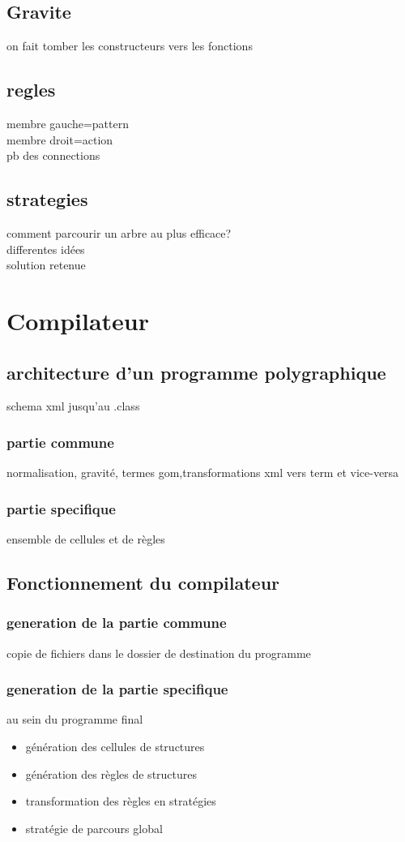 \documentclass[a4paper,11pt,titlepage]{article}
\begin{document}
{\subsection{Gravite}
on fait tomber les constructeurs vers les fonctions
\subsection{regles}
membre gauche=pattern\\membre droit=action\\pb des connections
\subsection{strategies}
comment parcourir un arbre au plus efficace?\\differentes id\'{e}es\\solution retenue
\section{Compilateur}
\subsection{architecture d'un programme polygraphique}
schema xml jusqu'au .class
\subsubsection{partie commune}
normalisation, gravit\'{e}, termes gom,transformations xml vers term et vice-versa
\subsubsection{partie specifique}
ensemble de cellules et de r\`{e}gles
\subsection{Fonctionnement du compilateur}
\subsubsection{generation de la partie commune}
copie de fichiers dans le dossier de destination du programme
\subsubsection{generation de la partie specifique}
au sein du programme final
\begin{itemize}
\item g\'{e}n\'{e}ration des cellules de structures
\item g\'{e}n\'{e}ration des r\`{e}gles de structures
\item transformation des r\`{e}gles en strat\'{e}gies
\item strat\'{e}gie de parcours global
\end {itemize}


}
\end{document}
